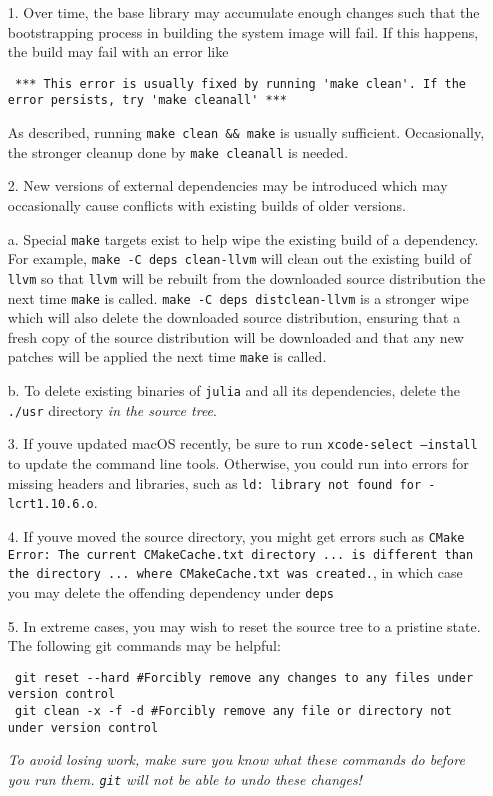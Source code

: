 \begin{itemize}
\item[1. ] Over time, the base library may accumulate enough changes such that the bootstrapping process in building the system image will fail. If this happens, the build may fail with an error like


\begin{lstlisting}
 *** This error is usually fixed by running 'make clean'. If the error persists, try 'make cleanall' ***
\end{lstlisting}

As described, running \texttt{make clean \&\& make} is usually sufficient. Occasionally, the stronger cleanup done by \texttt{make cleanall} is needed.


\item[2. ] New versions of external dependencies may be introduced which may occasionally cause conflicts with existing builds of older versions.

a. Special \texttt{make} targets exist to help wipe the existing build of a    dependency. For example, \texttt{make -C deps clean-llvm} will clean out the    existing build of \texttt{llvm} so that \texttt{llvm} will be rebuilt from the    downloaded source distribution the next time \texttt{make} is called.    \texttt{make -C deps distclean-llvm} is a stronger wipe which will also delete    the downloaded source distribution, ensuring that a fresh copy of the    source distribution will be downloaded and that any new patches will be    applied the next time \texttt{make} is called.

b. To delete existing binaries of \texttt{julia} and all its dependencies,    delete the \texttt{./usr} directory \emph{in the source tree}.


\item[3. ] If you{\textquotesingle}ve updated macOS recently, be sure to run \texttt{xcode-select --install} to update the command line tools. Otherwise, you could run into errors for missing headers and libraries, such as \texttt{ld: library not found for -lcrt1.10.6.o}.


\item[4. ] If you{\textquotesingle}ve moved the source directory, you might get errors such as  \texttt{CMake Error: The current CMakeCache.txt directory ... is different than the directory ... where     CMakeCache.txt was created.}, in which case you may delete the offending dependency under \texttt{deps}


\item[5. ] In extreme cases, you may wish to reset the source tree to a pristine state. The following git commands may be helpful:


\begin{lstlisting}
 git reset --hard #Forcibly remove any changes to any files under version control
 git clean -x -f -d #Forcibly remove any file or directory not under version control
\end{lstlisting}

\emph{To avoid losing work, make sure you know what these commands do before you run them. \texttt{git} will not be able to undo these changes!}

\end{itemize}


